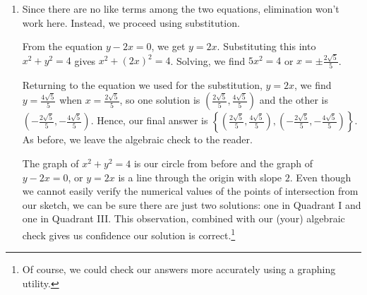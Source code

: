 \documentclass{ximera}
\begin{document}
\begin{example}
\begin{explanation}
\begin{enumerate}
\[\begin{array}{ccc}
&

\xrightarrow[\text{$-4E1 + E2$}]{\text{Replace $E2$ with}}


&

\left\{\begin{array}{lrcr} (E1) &  x^2 +y^2 & = & 4 \\ (E2) & -13y^2 & = & 20 \\ \end{array} \right.

\end{array} \]

Since the equation $-13y^2=20$ admits no real solution, the system is inconsistent.  To verify this graphically, we note that $x^2+y^2=4$ is the same circle as before, but when writing the second equation in standard form,  $\frac{x^2}{9} - \frac{y^2}{4} = 1$, we find a hyperbola centered at $(0,0)$ opening to the left and right with a transverse axis of length $6$ and a conjugate axis of length $4$.  

We see that the circle and the hyperbola have no points in common, hence, there are no solutions.


\begin{center}
\end{center}






\item  Since there are no like terms among the two equations, elimination won't work here. Instead, we proceed using substitution.

From the equation $y - 2x =0$, we get $y=2x$. Substituting this into $x^2+y^2=4$ gives $x^2+(2x)^2 = 4$.  Solving, we find  $5x^2 = 4$ or $x = \pm \frac{2 \sqrt{5}}{5}$.  

Returning to the equation we used for the substitution, $y = 2x$, we find $y = \frac{4 \sqrt{5}}{5}$ when $x = \frac{2 \sqrt{5}}{5}$, so one solution is $\left( \frac{2 \sqrt{5}}{5} , \frac{4 \sqrt{5}}{5} \right)$ and the other is   $\left( -\frac{2 \sqrt{5}}{5} , -\frac{4 \sqrt{5}}{5} \right)$.  Hence, our final answer is  $\left\{\left( \frac{2 \sqrt{5}}{5} , \frac{4 \sqrt{5}}{5} \right),  \left( -\frac{2 \sqrt{5}}{5} , -\frac{4 \sqrt{5}}{5} \right) \right\}$.  As before, we leave the algebraic check to the reader. 

The graph of  $x^2+y^2=4$ is our circle from before and the graph of $y - 2x =0$, or $y = 2x$ is a line through the origin with slope $2$.  Even though we cannot easily verify the numerical values of the points of intersection from our sketch, we can be sure there are just two solutions: one in Quadrant I and one in Quadrant III. This observation, combined with our (your) algebraic check gives us confidence our solution is correct.\footnote{Of course, we could check our answers more accurately using a graphing utility.}


\end{enumerate}
\end{explanation}
\end{example}
\end{document}
